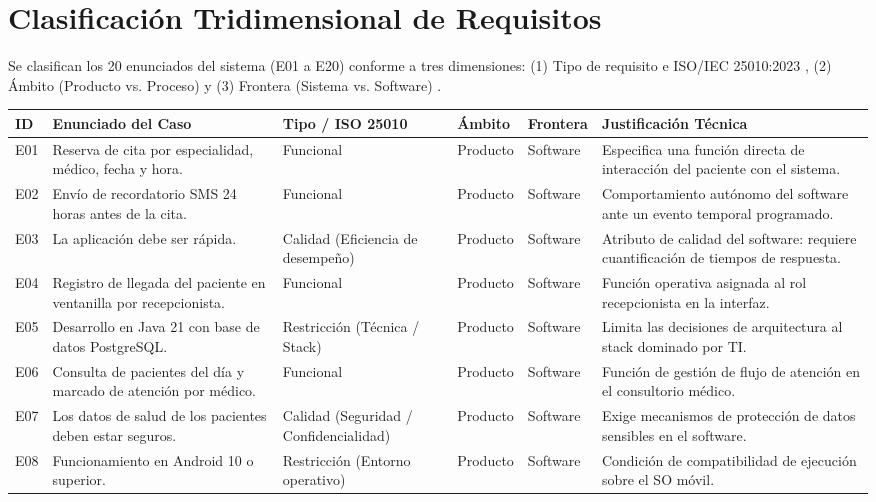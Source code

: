 \documentclass[conference]{IEEEtran}
\begin{document}
\section{Clasificaci\'on Tridimensional de Requisitos}
Se clasifican los 20 enunciados del sistema (E01 a E20) conforme a tres dimensiones: (1) Tipo de requisito e ISO/IEC 25010:2023 \cite{iso25010}, (2) \'Ambito (Producto vs. Proceso) y (3) Frontera (Sistema vs. Software) \cite{pohl2025,iso29148}.

\begin{center}
\scriptsize
\setlength{\tabcolsep}{3pt}
\begin{tabularx}{\textwidth}{@{}p{0.6cm}p{3.6cm}p{3.4cm}p{1.4cm}p{1.4cm}>{\raggedright\arraybackslash}X@{}}
\toprule
\textbf{ID} & \textbf{Enunciado del Caso} & \textbf{Tipo / ISO 25010} & \textbf{\'Ambito} & \textbf{Frontera} & \textbf{Justificaci\'on T\'ecnica}\\
\midrule
E01 & Reserva de cita por especialidad, m\'edico, fecha y hora. & Funcional & Producto & Software & Especifica una funci\'on directa de interacci\'on del paciente con el sistema.\\
E02 & Env\'io de recordatorio SMS 24 horas antes de la cita. & Funcional & Producto & Software & Comportamiento aut\'onomo del software ante un evento temporal programado.\\
E03 & La aplicaci\'on debe ser r\'apida. & Calidad (Eficiencia de desempe\~no) & Producto & Software & Atributo de calidad del software: requiere cuantificaci\'on de tiempos de respuesta.\\
E04 & Registro de llegada del paciente en ventanilla por recepcionista. & Funcional & Producto & Software & Funci\'on operativa asignada al rol recepcionista en la interfaz.\\
E05 & Desarrollo en Java 21 con base de datos PostgreSQL. & Restricci\'on (T\'ecnica / Stack) & Producto & Software & Limita las decisiones de arquitectura al stack dominado por TI.\\
E06 & Consulta de pacientes del d\'ia y marcado de atenci\'on por m\'edico. & Funcional & Producto & Software & Funci\'on de gesti\'on de flujo de atenci\'on en el consultorio m\'edico.\\
E07 & Los datos de salud de los pacientes deben estar seguros. & Calidad (Seguridad / Confidencialidad) & Producto & Software & Exige mecanismos de protecci\'on de datos sensibles en el software.\\
E08 & Funcionamiento en Android 10 o superior. & Restricci\'on (Entorno operativo) & Producto & Software & Condici\'on de compatibilidad de ejecuci\'on sobre el SO m\'ovil.\\

\end{tabularx}
\end{center}
\end{document}
